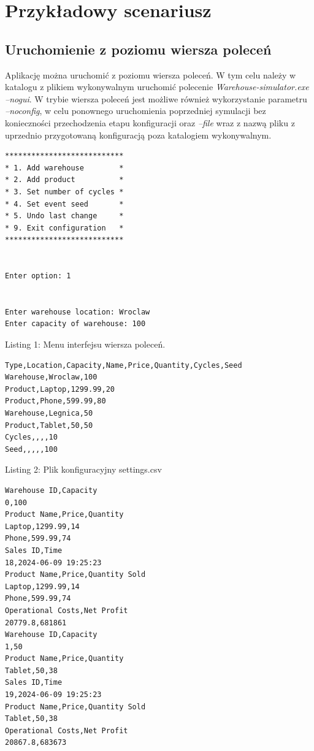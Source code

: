 \documentclass[11pt]{article}
\begin{document}
\section{Przykładowy scenariusz}
\subsection{Uruchomienie z poziomu wiersza poleceń}
Aplikację można uruchomić z poziomu wiersza poleceń. W tym celu należy w katalogu z plikiem wykonywalnym uruchomić polecenie \textit{Warehouse-simulator.exe --nogui}. W trybie wiersza poleceń jest możliwe również wykorzystanie parametru \textit{--noconfig}, w celu ponownego uruchomienia poprzedniej symulacji bez konieczności przechodzenia etapu konfiguracji oraz \textit{--file} wraz z nazwą pliku z uprzednio przygotowaną konfiguracją poza katalogiem wykonywalnym.

\newpage

\begin{verbatim}
***************************
* 1. Add warehouse        *
* 2. Add product          *
* 3. Set number of cycles *
* 4. Set event seed       *
* 5. Undo last change     *
* 9. Exit configuration   *
***************************


Enter option: 1


Enter warehouse location: Wroclaw
Enter capacity of warehouse: 100
\end{verbatim}

\begin{center}
    Listing 1: Menu interfejsu wiersza poleceń.
\end{center}

\begin{verbatim}
Type,Location,Capacity,Name,Price,Quantity,Cycles,Seed
Warehouse,Wroclaw,100
Product,Laptop,1299.99,20
Product,Phone,599.99,80
Warehouse,Legnica,50
Product,Tablet,50,50
Cycles,,,,10
Seed,,,,,100
\end{verbatim}

\begin{center}
    Listing 2: Plik konfiguracyjny settings.csv
\end{center}

\newpage

\begin{verbatim}
Warehouse ID,Capacity
0,100
Product Name,Price,Quantity
Laptop,1299.99,14
Phone,599.99,74
Sales ID,Time
18,2024-06-09 19:25:23
Product Name,Price,Quantity Sold
Laptop,1299.99,14
Phone,599.99,74
Operational Costs,Net Profit
20779.8,681861
Warehouse ID,Capacity
1,50
Product Name,Price,Quantity
Tablet,50,38
Sales ID,Time
19,2024-06-09 19:25:23
Product Name,Price,Quantity Sold
Tablet,50,38
Operational Costs,Net Profit
20867.8,683673
\end{verbatim}
\end{document}
